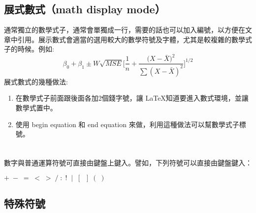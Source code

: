 \subsection{展式數式（math display mode）}
通常獨立的數學式子，通常會單獨成一行，需要的話也可以加入編號，以方便在文章中引用。展示數式會適當的選用較大的數學符號及字體，尤其是較複雜的數學式子的時候。例如:
$$\beta_0+\beta_1\pm{W\sqrt{MSE}}\bigg[\frac{1}{n}+\frac{{(X-\bar{X}})^2}{\sum{(X-\bar{X})^2}}\bigg]^{1/2}$$
展式數式的幾種做法:
\begin{enumerate}
\item 在數學式子前面跟後面各加2個錢字號，讓 \LaTeX 知道要進入數式環境，並讓數學式置中。
\item 使用 begin equation 和 end equation 來做，利用這種做法可以幫數學式子標號。
\end{enumerate}


\section{}
數字與普通運算符號可直接由鍵盤上鍵入。譬如，下列符號可以直接由鍵盤鍵入：

        \begin{center}
         $  + \;-\; =\; <\; > \;/ \;:\; !\;\; |\; \;[\;\; ] \;(\; )$\\
        \end{center}

\subsection{特殊符號}

